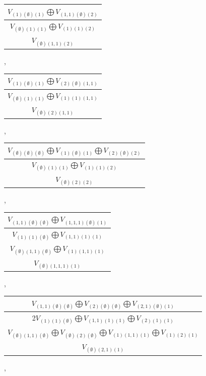 \documentclass[letterpaper,11pt]{article}
\begin{document}
	\begin{tabular}{| c |}
		\hline
		$V_{(1)(\emptyset)(1)}$$\bigoplus$$V_{(1,1)(\emptyset)(2)}$\\
		\hline
		$V_{(\emptyset)(1)(1)}$$\bigoplus$$V_{(1)(1)(2)}$\\
		\hline
		$V_{(\emptyset)(1,1)(2)}$\\
		\hline
	\end{tabular}, 
	\begin{tabular}{| c |}
		\hline
		$V_{(1)(\emptyset)(1)}$$\bigoplus$$V_{(2)(\emptyset)(1,1)}$\\
		\hline
		$V_{(\emptyset)(1)(1)}$$\bigoplus$$V_{(1)(1)(1,1)}$\\
		\hline
		$V_{(\emptyset)(2)(1,1)}$\\
		\hline
	\end{tabular}, 
	\newline 
	\begin{tabular}{| c |}
		\hline
		$V_{(\emptyset)(\emptyset)(\emptyset)}$$\bigoplus$$V_{(1)(\emptyset)(1)}$$\bigoplus$$V_{(2)(\emptyset)(2)}$\\
		\hline
		$V_{(\emptyset)(1)(1)}$$\bigoplus$$V_{(1)(1)(2)}$\\
		\hline
		$V_{(\emptyset)(2)(2)}$\\
		\hline
	\end{tabular}, 
	\begin{tabular}{| c |}
		\hline
		$V_{(1,1)(\emptyset)(\emptyset)}$$\bigoplus$$V_{(1,1,1)(\emptyset)(1)}$\\
		\hline
		$V_{(1)(1)(\emptyset)}$$\bigoplus$$V_{(1,1)(1)(1)}$\\
		\hline
		$V_{(\emptyset)(1,1)(\emptyset)}$$\bigoplus$$V_{(1)(1,1)(1)}$\\
		\hline
		$V_{(\emptyset)(1,1,1)(1)}$\\
		\hline
	\end{tabular}, 
	\newline 
	\begin{tabular}{| c |}
		\hline
		$V_{(1,1)(\emptyset)(\emptyset)}$$\bigoplus$$V_{(2)(\emptyset)(\emptyset)}$$\bigoplus$$V_{(2,1)(\emptyset)(1)}$\\
		\hline
		2$V_{(1)(1)(\emptyset)}$$\bigoplus$$V_{(1,1)(1)(1)}$$\bigoplus$$V_{(2)(1)(1)}$\\
		\hline
		$V_{(\emptyset)(1,1)(\emptyset)}$$\bigoplus$$V_{(\emptyset)(2)(\emptyset)}$$\bigoplus$$V_{(1)(1,1)(1)}$$\bigoplus$$V_{(1)(2)(1)}$\\
		\hline
		$V_{(\emptyset)(2,1)(1)}$\\
		\hline
	\end{tabular}, 
\end{document}
